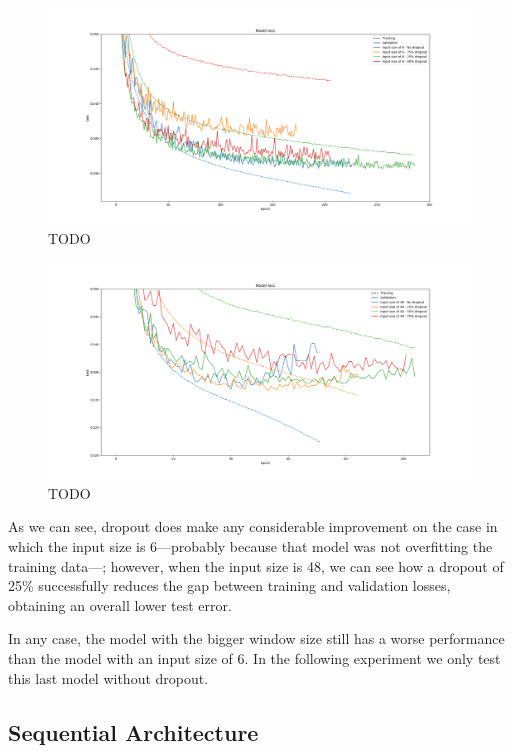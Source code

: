 \documentclass[]{article}
\begin{document}
\begin{figure}[H]
	\centering
	\includegraphics[width=\textwidth]{drop31}
	\caption{TODO}
	\label{f:drop31}
\end{figure}

\begin{figure}[H]
	\centering
	\includegraphics[width=\textwidth]{drop32}
	\caption{TODO}
	\label{f:drop32}
\end{figure}

As we can see, dropout does make any considerable improvement on the case in which the input size is 6---probably because that model was not overfitting the training data---; however, when the input size is 48, we can see how a dropout of 25\% successfully reduces the gap between training and validation losses, obtaining an overall lower test error.

In any case, the model with the bigger window size still has a worse performance than the model with an input size of 6. In the following experiment we only test this last model without dropout.

\subsection{Sequential Architecture}
\end{document}
